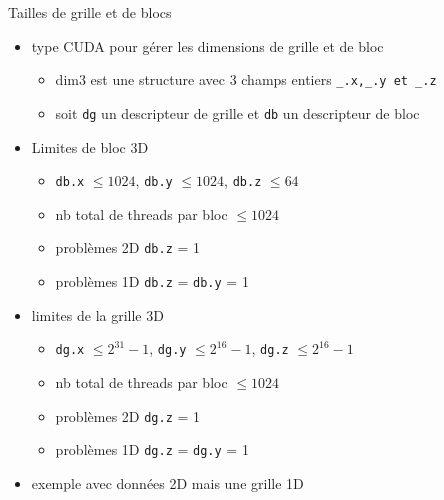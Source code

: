 \documentclass[11pt,mathserif]{beamer}
\newcommand{\gezi}{\faLongArrowRight}
\begin{document}
\begin{frame}{Tailles de grille et de blocs}
  \begin{itemize}[<+->]
    \item type CUDA pour gérer les dimensions de grille et de bloc
    \begin{itemize}
      \item \alert{dim3} est une structure avec 3 champs entiers \texttt{\_.x,\_.y et \_.z}
      \item soit \texttt{dg} un descripteur de grille et \texttt{db} un descripteur de bloc
    \end{itemize}
  \item Limites de bloc 3D
   \begin{itemize}
     \item \texttt{db.x} $\leqslant 1024$, \texttt{db.y} $\leqslant 1024$, \texttt{db.z} $\leqslant 64$ 
     \item nb total de threads par bloc $\leqslant 1024$
     \item problèmes 2D \gezi \texttt{db.z} = 1 
     \item problèmes 1D \gezi \texttt{db.z} = \texttt{db.y} = 1
   \end{itemize}
 \item limites de la grille 3D
   \begin{itemize}
     \item \texttt{dg.x} $\leqslant 2^{31}-1$, \texttt{dg.y} $\leqslant 2^{16} - 1 $, \texttt{dg.z} $\leqslant 2^{16}-1$
     \item nb total de threads par bloc $\leqslant 1024$
     \item problèmes 2D \gezi \texttt{dg.z} = 1 
     \item problèmes 1D \gezi \texttt{dg.z} = \texttt{dg.y} = 1
  \end{itemize}
 \item exemple avec données 2D mais une grille 1D
  
 \end{itemize}
\end{frame}
\end{document}
